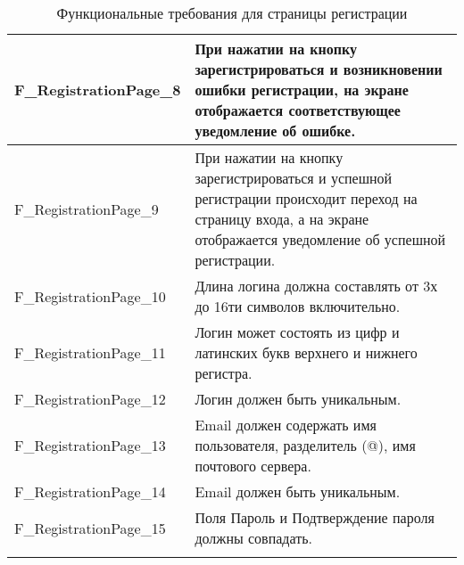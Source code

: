 \documentclass[a4paper, 14pt]{article}
\begin{document}
\begin{longtable}{| p{} | p{} |}
    F\_RegistrationPage\_8          & При нажатии на кнопку зарегистрироваться и возникновении ошибки регистрации, на экране отображается соответствующее уведомление об ошибке.                                         \\ \hline
    F\_RegistrationPage\_9          & При нажатии на кнопку зарегистрироваться и успешной регистрации происходит переход на страницу входа, а на экране отображается уведомление об успешной регистрации.                \\ \hline
    F\_RegistrationPage\_10         & Длина логина должна составлять от 3х до 16ти символов включительно.                                                                                                                \\ \hline
    F\_RegistrationPage\_11         & Логин может состоять из цифр и латинских букв верхнего и нижнего регистра.                                                                                                         \\ \hline
    F\_RegistrationPage\_12         & Логин должен быть уникальным.                                                                                                         \\ \hline
    F\_RegistrationPage\_13         & Email должен содержать имя пользователя, разделитель (@), имя почтового сервера.                                                                                                         \\ \hline
    F\_RegistrationPage\_14         & Email должен быть уникальным.                                                                                                         \\ \hline
    F\_RegistrationPage\_15         & Поля Пароль и Подтверждение пароля должны совпадать.                                                                                                         \\ \hline

    \caption{Функциональные требования для страницы регистрации}
\end{longtable}
\end{document}

